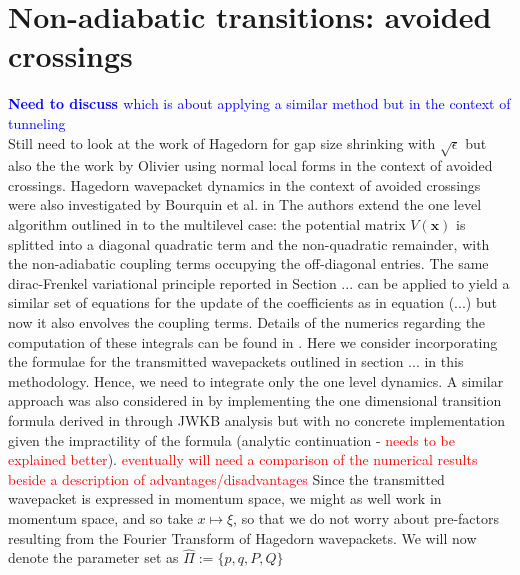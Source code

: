 \usepackage{amsmath}
\newtheorem{theorem}{Theorem}[section]
\newtheorem{corollary}{Corollary}[theorem]
\newtheorem{lemma}[theorem]{Lemma}


  \section{Non-adiabatic transitions: avoided crossings}
  \textcolor{blue}{
\textbf{Need to discuss \cite{gradinaruTunnelingDynamicsSpawning2010}}
 which is about applying a similar method but in the context of tunneling}
 \\
Still need to look at the work of Hagedorn for 
gap size shrinking with $\sqrt{\epsilon}$ but also the 
the work by Olivier using normal local forms in the context 
of avoided crossings.
Hagedorn wavepacket dynamics in the context of avoided 
crossings were also investigated by Bourquin et al. in
\cite{bourquinNonadiabaticTransitionsAvoided2012} 
The authors extend the one level algorithm 
outlined in \cite{lubichQuantumClassicalMolecular2008} to the 
multilevel case: the potential matrix $V(\bm{x})$ is splitted
into a diagonal quadratic term and the non-quadratic remainder,
with the non-adiabatic coupling terms occupying the off-diagonal entries.
The same dirac-Frenkel variational principle reported in Section ...
can be applied to yield a similar set of equations for the update of the 
coefficients as in equation (...) but now it also envolves the coupling terms.
Details of the numerics regarding the computation of these integrals can be 
found in \cite{bourquinNumericalAlgorithmsSemiclassical2017}.
Here we consider incorporating the formulae for the transmitted wavepackets
outlined in section ... in this methodology. Hence, we need to integrate only 
the one level dynamics. A similar approach was also considered in 
\cite{bourquinNonadiabaticTransitionsAvoided2012} by implementing the 
one dimensional transition formula derived in
\cite{hagedornDeterminationNonadiabaticScattering2005} through JWKB analysis 
but with no concrete implementation given the impractility of 
the formula 
(analytic continuation - \textcolor{red}{needs to be explained better}).
\textcolor{red}{eventually will need a comparison of the numerical results
beside a description of advantages/disadvantages}
Since the transmitted wavepacket is expressed in momentum space, we might 
as well work in momentum space, and so take $x \mapsto \xi$, so that we do not worry about 
pre-factors resulting from the Fourier Transform of Hagedorn wavepackets.
We will now denote the parameter set as $\hat{\Pi} := \{p, q, P, Q\}$

